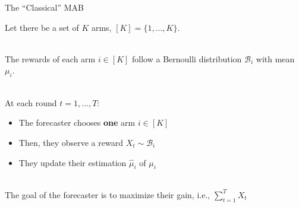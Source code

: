 \documentclass[16pt,usenames,dvipsnames, notheorems]{beamer}
\theoremstyle{definition}
\theoremstyle{example}
\theoremstyle{plain}
\begin{document}
\begin{frame}{The ``Classical'' MAB}
\small


Let there be a set of $K$ arms, $[K] = \{1,\dots, K\}$.

~\\

The rewards of each arm $i \in [K]$ follow a Bernoulli distribution $\mathcal{B}_i$ with mean $\mu_i$.

~\\

At each round $t = 1,\dots,T$:
\begin{itemize}
	\item The forecaster chooses \textbf{one} arm $i \in [K]$
	\item Then, they observe a reward $X_t \sim \mathcal{B}_i$
	\item They update their estimation $\hat{\mu}_i$ of $\mu_i$
\end{itemize}

~\\

The goal of the forecaster is to maximize their gain, i.e., $\sum_{t=1}^{T} X_t$

\end{frame}
\end{document}

